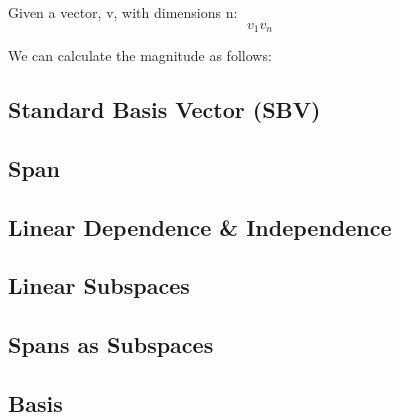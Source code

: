 Given a vector, v, with dimensions n:
\begin{equation}
	v_1
	v_n
\end{equation}

We can calculate the magnitude as follows:




\subsection{Standard Basis Vector (SBV)}\label{concept1.5}

\subsection{Span}\label{concept1.6}

\subsection{Linear Dependence \& Independence}\label{concept1.7}

\subsection{Linear Subspaces}\label{concept1.8}

\subsection{Spans as Subspaces}\label{concept1.9}

\subsection{Basis}\label{concept1.10}

